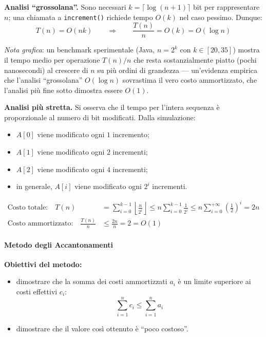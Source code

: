 \documentclass[12pt, a4paper]{article}
\begin{document}
\textbf{Analisi ``grossolana''.} Sono necessari $k = \lceil \log(n+1) \rceil$ bit per rappresentare $n$; una chiamata a \texttt{increment()} richiede tempo $O(k)$ nel caso pessimo. Dunque:
$$T(n) = O(nk) \qquad \Longrightarrow \qquad \frac{T(n)}{n} = O(k) = O(\log n)$$

\textit{Nota grafica}: un benchmark sperimentale (Java, $n=2^k$ con $k \in [20,35]$) mostra il tempo medio per operazione $T(n)/n$ che resta sostanzialmente piatto (pochi nanosecondi) al crescere di $n$ su più ordini di grandezza — un'evidenza empirica che l'analisi ``grossolana'' $O(\log n)$ sovrastima il vero costo ammortizzato, che l'analisi più fine sotto dimostra essere $O(1)$.

\textbf{Analisi più stretta.} Si osserva che il tempo per l'intera sequenza è proporzionale al numero di bit modificati. Dalla simulazione:
\begin{itemize}
    \item $A[0]$ viene modificato ogni $1$ incremento;
    \item $A[1]$ viene modificato ogni $2$ incrementi;
    \item $A[2]$ viene modificato ogni $4$ incrementi;
    \item in generale, $A[i]$ viene modificato ogni $2^i$ incrementi.
\end{itemize}

\begin{tcolorbox}[colback=lightergray!10, colframe=tocsec, title=\textbf{Risultato: Costo Ammortizzato del Contatore Binario}]
\label{prop:contatore-aggregazione}
\begin{align*}
\text{Costo totale:}\quad T(n) &= \sum_{i=0}^{k-1} \left\lfloor \frac{n}{2^i} \right\rfloor \le n\sum_{i=0}^{k-1}\frac{1}{2^i} \le n\sum_{i=0}^{+\infty}\left(\frac{1}{2}\right)^i = 2n \\
\text{Costo ammortizzato:}\quad \frac{T(n)}{n} &\le \frac{2n}{n} = 2 = O(1)
\end{align*}
\end{tcolorbox}

\paragraph{Metodo degli Accantonamenti}

\textbf{Obiettivi del metodo:}
\begin{itemize}
    \item dimostrare che la somma dei costi ammortizzati $a_i$ è un limite superiore ai costi effettivi $c_i$:
    $$\sum_{i=1}^n c_i \le \sum_{i=1}^n a_i$$
    \item dimostrare che il valore così ottenuto è ``poco costoso''.
\end{itemize}
\end{document}
